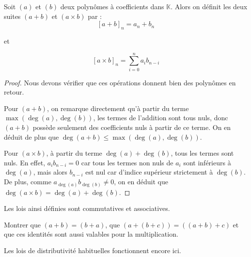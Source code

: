 \begin{defi}
    Soit $(a)$ et $(b)$ deux polynômes à coefficients dans $\mathbb K$. Alors on définit les deux suites $(a+b)$ et $(a\times b)$ par :
    $$[a+b]_n = a_n + b_n$$
    \begin{center} et \end{center}
    $$[a\times b]_n = \sum_{i=0}^n a_i b_{n-i}$$
\end{defi}
\begin{proof}
    Nous devons vérifier que ces opérations donnent bien des polynômes en retour. 
    
    Pour $(a+b)$, on remarque directement qu'à partir du terme $\max(\deg(a),\deg(b))$, les termes de l'addition sont tous nuls, donc $(a+b)$ possède seulement des coefficients nuls à partir de ce terme. On en déduit de plus que $\deg(a+b)\leq \max(\deg(a),\deg(b))$.
    
    Pour $(a\times b)$, à partir du terme $\deg(a)+\deg(b)$, tous les termes sont nuls. En effet, $a_ib_{n-i}=0$ car tous les termes non nuls de $a_i$ sont inférieurs à $\deg(a)$, mais alors $b_{n-i}$ est nul car d'indice supérieur strictement à $\deg(b)$. De plus, comme $a_{\deg(a)}b_{\deg(b)}\neq 0$, on en déduit que $\deg(a\times b)=\deg(a) + \deg (b)$.
\end{proof}

Les lois ainsi définies sont commutatives et associatives.

\begin{exo}
    Montrer que $(a+b)=(b+a)$, que $(a+(b+c))=((a+b)+c)$ et que ces identités sont aussi valables pour la multiplication.
\end{exo}

Les lois de distributivité habituelles fonctionnent encore ici.


